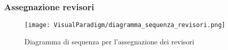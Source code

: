
\subsubsection{Assegnazione revisori}
\label{sec:revisori}

\begin{figure}[ht]
  \centering
  \texttt{[image: VisualParadigm/diagramma\_sequenza\_revisori.png]}
  \caption{Diagramma di sequenza per l'assegnazione dei revisori}
  \label{fig:revisori}
\end{figure}

